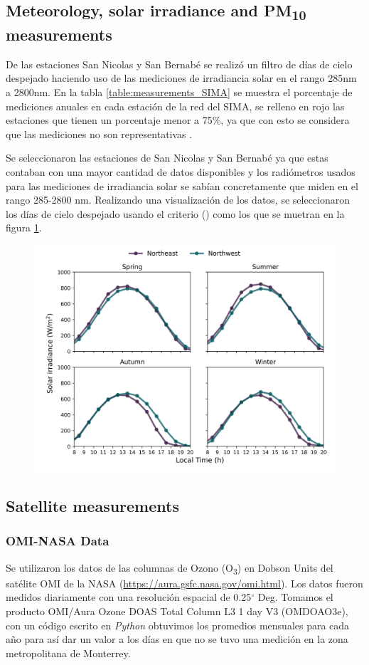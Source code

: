 \subsection{Meteorology, solar irradiance and PM\textsubscript{10} measurements}
De las estaciones San Nicolas y San Bernabé se realizó un filtro de días de cielo despejado haciendo uso de las mediciones de irradiancia
solar en el rango 285nm a 2800nm. En la tabla \ref{table:measurements_SIMA} se muestra el porcentaje de mediciones anuales en cada estación de la red 
del SIMA, se relleno en rojo las estaciones que tienen un porcentaje menor a 75\%, ya que con esto se considera que
las mediciones no son representativas \cite{molina2019}.

Se seleccionaron las estaciones de San Nicolas y San Bernabé ya que estas contaban con una mayor cantidad de datos disponibles
y los radiómetros usados para las mediciones de irradiancia solar se sabían concretamente que miden en el rango 285-2800 nm.
Realizando una visualización de los datos, se seleccionaron los días de cielo despejado usando el criterio ()
como los que se muetran en la figura \ref{fig:clear_days}.
\begin{figure}[H]
    \centering
    \includegraphics[scale=0.5]{images/Clear_days.png}
    \caption{}
    \label{fig:clear_days}
\end{figure}
\subsection{Satellite measurements}
\subsubsection{OMI-NASA Data}
Se utilizaron los datos de las columnas de Ozono (O\textsubscript{3}) en Dobson Units del satélite OMI de la NASA 
(\url{https://aura.gsfc.nasa.gov/omi.html}). Los datos fueron medidos diariamente con una resolución espacial de 0.25$^{\circ}$ Deg.
Tomamos el producto OMI/Aura Ozone DOAS Total Column L3 1 day V3 (OMDOAO3e), con un código escrito en \textit{Python} obtuvimos
los promedios mensuales para cada año para así dar un valor a los días en que no se tuvo una medición en la zona metropolitana de Monterrey.
